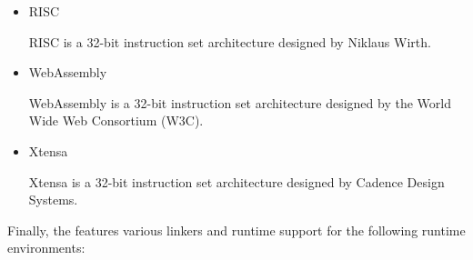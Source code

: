 \begin{itemize}
\item RISC\nopagebreak

RISC is a 32-bit instruction set architecture designed by Niklaus Wirth.
\seerisc

\item WebAssembly\nopagebreak

WebAssembly is a 32-bit instruction set architecture designed by the World Wide Web Consortium (W3C).
\seewasm

\item Xtensa\nopagebreak

Xtensa is a 32-bit instruction set architecture designed by Cadence Design Systems.
\seextensa

\end{itemize}

Finally, the \ecs{} features various linkers and runtime support for the following runtime environments:


